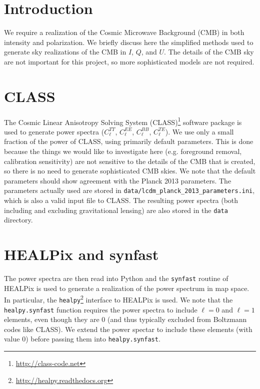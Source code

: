 \documentclass[twoside,10pt]{article}
\title{\doctitle}
\author{\myname\
  \small \myemail}
\date{Feb 4, 2015}
\newcommand{\ClTT}[0]{C_\ell^{TT}}
\newcommand{\ClTE}[0]{C_\ell^{TE}}
\newcommand{\ClEE}[0]{C_\ell^{EE}}
\newcommand{\ClBB}[0]{C_\ell^{BB}}
\begin{document}
\maketitle

\section{Introduction}
\label{sec:intro}

We require a realization of the Cosmic Microwave Background (CMB) in both
intensity and polarization. We briefly discuss here the simplified methods
used to generate sky realizations of the CMB in $I$, $Q$, and $U$. The details
of the CMB sky are not important for this project, so more sophisticated
models are not required.

\section{CLASS}
\label{sec:class}

The Cosmic Linear Anisotropy Solving System
(CLASS)\footnote{\url{http://class-code.net}} software package is used to
generate power spectra ($\ClTT$, $\ClEE$, $\ClBB$, $\ClTE$). We use only a
small fraction of the power of CLASS, using primarily default parameters.
This is done because the things we would like to investigate here (e.g.
foreground removal, calibration sensitivity) are not sensitive to the details
of the CMB that is created, so there is no need to generate sophisticated
CMB skies. We note that the default parameters should show agreement with
the Planck 2013 parameters\cite{planck_collaboration_planck_2014}. The
parameters actually used are stored in
\texttt{data/lcdm\_planck\_2013\_parameters.ini}, which is also a valid input
file to CLASS. The resulting power spectra (both including and excluding
gravitational lensing) are also stored in the \texttt{data} directory.

\section{HEALPix and synfast}
\label{sec:healpix_and_synfast}

The power spectra are then read into Python and the \texttt{synfast} routine
of HEALPix\cite{gorski_healpix:_2005} is used to generate a realization of
the power spectrum in map space. In particular, the
\texttt{healpy}\footnote{\url{http://healpy.readthedocs.org}} interface to
HEALPix is used. We note that the \texttt{healpy.synfast} function requires
the power spectra to include $\ell = 0$ and $\ell = 1$ elements, even though
they are 0 (and thus typically excluded from Boltzmann codes like CLASS). We
extend the power spectar to include these elements (with value 0) before
passing them into \texttt{healpy.synfast}.



\end{document}
